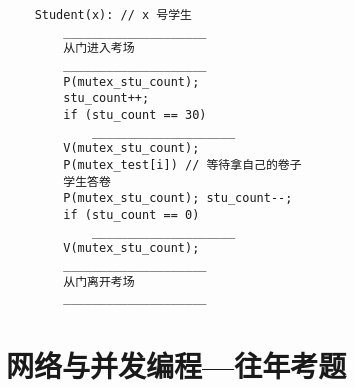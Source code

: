 \begin{problems}
\begin{verbatim}
    Student(x): // x 号学生
        ____________________
        从门进入考场
        ____________________
        P(mutex_stu_count);
        stu_count++;
        if (stu_count == 30)
            ____________________
        V(mutex_stu_count);
        P(mutex_test[i]) // 等待拿自己的卷子
        学生答卷
        P(mutex_stu_count); stu_count--;
        if (stu_count == 0)
            ____________________
        V(mutex_stu_count);
        ____________________
        从门离开考场
        ____________________
        \end{verbatim}
    \end{problems}

\chapter{网络与并发编程{---}往年考题}\thispagestyle{empty}
